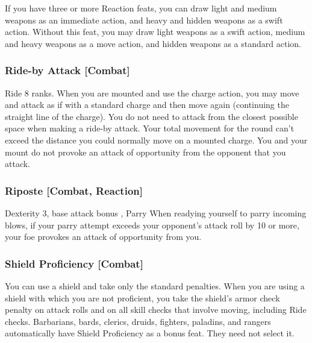 If you have three or more Reaction feats, you can draw light and medium weapons as an immediate action, and heavy and hidden weapons as a swift action.
 Without this feat, you may draw light weapons as a swift action, medium and heavy weapons as a move action, and hidden weapons as a standard action.


\subsubsection{Ride-by Attack [Combat]}
\featpre Ride 8 ranks.
 When you are mounted and use the charge action, you may move and attack as if with a standard charge and then move again (continuing the straight line of the charge). You do not need to attack from the closest possible space when making a ride-by attack. Your total movement for the round can't exceed the distance you could normally move on a mounted charge. You and your mount do not provoke an attack of opportunity from the opponent that you attack.

\subsubsection{Riposte [Combat, Reaction]}
\featpre Dexterity 3, base attack bonus , Parry
\featben When readying yourself to parry incoming blows, if your parry attempt exceeds your opponent's attack roll by 10 or more, your foe provokes an attack of opportunity from you.

\subsubsection{Shield Proficiency [Combat]}
 You can use a shield and take only the standard penalties.
 When you are using a shield with which you are not proficient, you take the shield's armor check penalty on attack rolls and on all skill checks that involve moving, including Ride checks.
 Barbarians, bards, clerics, druids, fighters, paladins, and rangers automatically have Shield Proficiency as a bonus feat. They need not select it.

